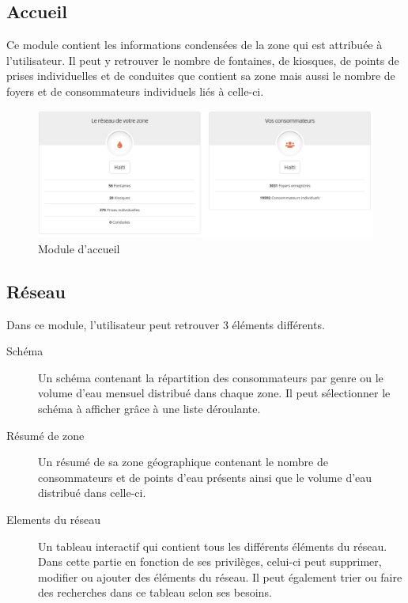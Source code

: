 \documentclass{EPL-master-thesis-covers-FR}
\begin{document}
			\subsection{Accueil}
				Ce module contient les informations condensées de la zone qui est attribuée à l'utilisateur. Il peut y retrouver le nombre de fontaines, de kiosques, de points de prises individuelles et de conduites que contient sa zone mais aussi le nombre de foyers et de consommateurs individuels liés à celle-ci. 
								
				\begin{figure}[H]
					\centering
					\includegraphics[width=1\textwidth]{images/dashboard}
					\caption{Module d'accueil}
				\end{figure}
				
				
			\subsection{Réseau}
				\label{sec:reseau}
				Dans ce module, l'utilisateur peut retrouver 3 éléments différents.
				
				\begin{description}
				\item[Schéma] Un schéma contenant la répartition des consommateurs par genre ou le volume d'eau mensuel distribué dans chaque zone. Il peut sélectionner le schéma à afficher grâce à une liste déroulante.
				\item[Résumé de zone] Un résumé de sa zone géographique contenant le nombre de consommateurs et de points d'eau présents ainsi que le volume d'eau distribué dans celle-ci.
				\item[Elements du réseau] Un tableau interactif qui contient tous les différents éléments du réseau. Dans cette partie en fonction de ses privilèges, celui-ci peut supprimer, modifier ou ajouter des éléments du réseau. Il peut également trier ou faire des recherches dans ce tableau selon ses besoins.
				\end{description}
				
\end{document}
